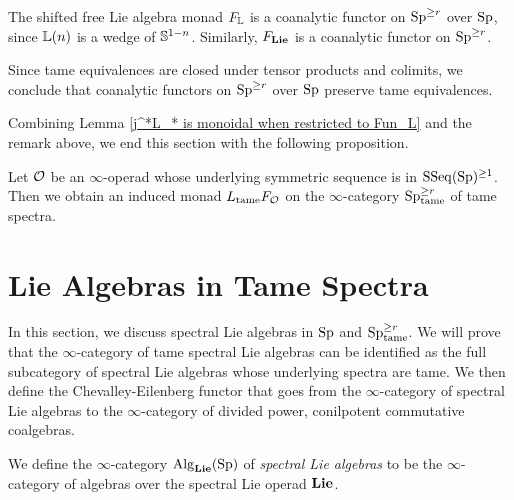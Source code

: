 \begin{example}
	The shifted free Lie algebra monad $F_{{\mathbb{L}}}$ is a coanalytic functor on $\operatorname{Sp}^{\geq r}$ over $\operatorname{Sp}$, since ${\mathbb{L}}(n)$ is a wedge of ${\mathbb{S}}^{1-n}$.
	Similarly, $F_{\mathbf{Lie}}$ is a coanalytic functor on $\operatorname{Sp}^{\geq r}$.
\end{example}

\begin{remark}
\label{coanalytic functors preserve tame equivalences}
	Since tame equivalences are closed under tensor products and colimits,
	we conclude that coanalytic functors on $\operatorname{Sp}^{\geq r}$ over $\operatorname{Sp}$ preserve tame equivalences. 
\end{remark}
Combining Lemma \ref{j^*L_* is monoidal when restricted to Fun_L} and the remark above, we end this section with the following proposition.
\begin{proposition}
\label{Induced Monads}
Let ${\mathcal{O}}$ be an $\infty$-operad whose underlying symmetric sequence is in $\operatorname{SSeq}(\operatorname{Sp})^{\geq 1}$.
Then we obtain an induced monad $L_{\operatorname{\operatorname{tame}}} F_{{\mathcal{O}}}$ on the $\infty$-category $\operatorname{Sp}^{\geq r}_{\operatorname{\operatorname{tame}}}$ of tame spectra.
\end{proposition}


\section{Lie Algebras in Tame Spectra}
\label{Lie Algebras in Tame Spectra}
In this section, we discuss spectral Lie algebras in $\operatorname{Sp}$ and $\operatorname{Sp}^{\geq r}_{\operatorname{tame}}$. We will prove that the $\infty$-category of tame spectral Lie algebras can be identified as the full subcategory of spectral Lie algebras whose underlying spectra are tame.
We then define the Chevalley-Eilenberg functor that goes from the $\infty$-category of spectral Lie algebras to the $\infty$-category of divided power, conilpotent commutative coalgebras.


\begin{definition}
\label{Spectral Lie operad}
We define the $\infty$-category $\operatorname{Alg}_{\mathbf{Lie}}(\operatorname{Sp})$ of \emph{spectral Lie algebras} to be the $\infty$-category of algebras over the spectral Lie operad $\mathbf{Lie}$.
\end{definition}

